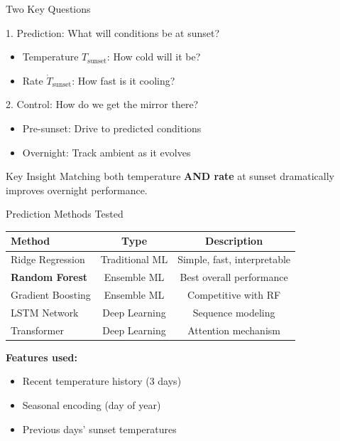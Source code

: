 \documentclass[aspectratio=169,11pt]{beamer}
\begin{document}
\begin{frame}{Two Key Questions}

\begin{block}{1. Prediction: What will conditions be at sunset?}
\begin{itemize}
    \item Temperature $T_\text{sunset}$: How cold will it be?
    \item Rate $\dot{T}_\text{sunset}$: How fast is it cooling?
\end{itemize}
\end{block}

\vspace{1em}

\begin{block}{2. Control: How do we get the mirror there?}
\begin{itemize}
    \item Pre-sunset: Drive to predicted conditions
    \item Overnight: Track ambient as it evolves
\end{itemize}
\end{block}

\vspace{1em}

\begin{alertblock}{Key Insight}
Matching both temperature \textbf{AND rate} at sunset dramatically improves overnight performance.
\end{alertblock}

\end{frame}

\begin{frame}{Prediction Methods Tested}

\centering
\begin{tabular}{l|cc}
\toprule
\textbf{Method} & \textbf{Type} & \textbf{Description} \\
\midrule
Ridge Regression & Traditional ML & Simple, fast, interpretable \\
\textbf{Random Forest} & Ensemble ML & Best overall performance \\
Gradient Boosting & Ensemble ML & Competitive with RF \\
LSTM Network & Deep Learning & Sequence modeling \\
Transformer & Deep Learning & Attention mechanism \\
\bottomrule
\end{tabular}

\vspace{1em}

\textbf{Features used:}
\begin{itemize}
    \item Recent temperature history (3 days)
    \item Seasonal encoding (day of year)
    \item Previous days' sunset temperatures
\end{itemize}

\end{frame}
\end{document}
